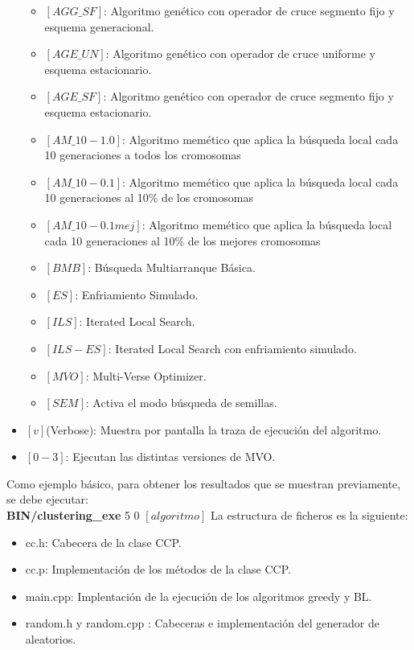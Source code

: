 \begin{itemize}
\begin{itemize}
      \item $[AGG\_SF]$: Algoritmo genético con operador de cruce segmento fijo y esquema generacional.
      \item $[AGE\_UN]$: Algoritmo genético con operador de cruce uniforme y esquema estacionario.
      \item $[AGE\_SF]$: Algoritmo genético con operador de cruce segmento fijo y esquema estacionario.
      \item $[AM\_10-1.0]$: Algoritmo memético que aplica la búsqueda local cada 10 generaciones a todos los cromosomas
      \item $[AM\_10-0.1]$: Algoritmo memético que aplica la búsqueda local cada 10 generaciones al 10\% de los cromosomas
      \item $[AM\_10-0.1mej]$: Algoritmo memético que aplica la búsqueda local cada 10 generaciones al 10\% de los mejores cromosomas
      \item $[BMB]$: Búsqueda Multiarranque Básica.
      \item $[ES]$: Enfriamiento Simulado.
      \item $[ILS]$: Iterated Local Search.
      \item $[ILS-ES]$: Iterated Local Search con enfriamiento simulado.
      \item $[MVO]$: Multi-Verse Optimizer.
      \item $[SEM]$: Activa el modo búsqueda de semillas.
   \end{itemize}
   \item $[v]$(Verbose): Muestra por pantalla la traza de ejecución del algoritmo.
   \item $[0-3]$: Ejecutan las distintas versiones de MVO.
\end{itemize}

Como ejemplo básico, para obtener los resultados que se muestran previamente, se debe ejecutar:\\ \textbf{BIN/clustering\_exe} 5 0 $[algoritmo]$
\newpage
La estructura de ficheros es la siguiente:
\begin{itemize}
   \item cc.h: Cabecera de la clase CCP.
   \item cc.p: Implementación de los métodos de la clase CCP.
   \item main.cpp: Implentación de la ejecución de los algoritmos greedy y BL.
   \item random.h y random.cpp : Cabeceras e implementación del generador de aleatorios.
\end{itemize}
